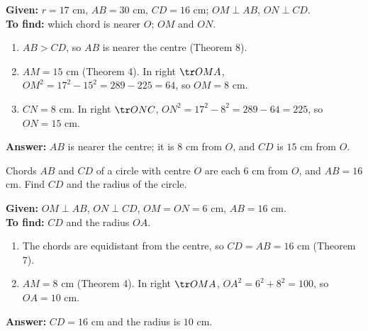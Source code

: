 \textbf{Given:} $r=17$ cm, $AB=30$ cm, $CD=16$ cm; $OM\perp AB$, $ON\perp CD$.\\
\textbf{To find:} which chord is nearer $O$; $OM$ and $ON$.
\begin{enumerate}[leftmargin=1.8em,itemsep=1pt]
  \item $AB>CD$, so $AB$ is nearer the centre (Theorem 8).
  \item $AM=15$ cm (Theorem 4). In right $\tr OMA$, $OM^2=17^2-15^2=289-225=64$, so $OM=8$ cm.
  \item $CN=8$ cm. In right $\tr ONC$, $ON^2=17^2-8^2=289-64=225$, so $ON=15$ cm.
\end{enumerate}
\textbf{Answer:} $AB$ is nearer the centre; it is $8$ cm from $O$, and $CD$ is $15$ cm from $O$.

\begin{example}
Chords $AB$ and $CD$ of a circle with centre $O$ are each $6$ cm from $O$, and $AB=16$ cm. Find $CD$ and the radius of the circle.
\end{example}


\textbf{Given:} $OM\perp AB$, $ON\perp CD$, $OM=ON=6$ cm, $AB=16$ cm.\\
\textbf{To find:} $CD$ and the radius $OA$.
\begin{enumerate}[leftmargin=1.8em,itemsep=1pt]
  \item The chords are equidistant from the centre, so $CD=AB=16$ cm (Theorem 7).
  \item $AM=8$ cm (Theorem 4). In right $\tr OMA$, $OA^2=6^2+8^2=100$, so $OA=10$ cm.
\end{enumerate}
\textbf{Answer:} $CD=16$ cm and the radius is $10$ cm.

